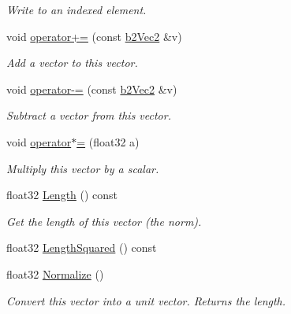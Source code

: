 \begin{DoxyCompactItemize}
\begin{DoxyCompactList}\small\item\em Write to an indexed element. \end{DoxyCompactList}\item 
\mbox{\label{structb2Vec2_a590789342e22ac1e7f9c1a63a2778b6d}} 
void \hyperlink{structb2Vec2_a590789342e22ac1e7f9c1a63a2778b6d}{operator+=} (const \hyperlink{structb2Vec2}{b2\+Vec2} \&v)
\begin{DoxyCompactList}\small\item\em Add a vector to this vector. \end{DoxyCompactList}\item 
\mbox{\label{structb2Vec2_a6b48cab4695a979ae40b7613aedc8b17}} 
void \hyperlink{structb2Vec2_a6b48cab4695a979ae40b7613aedc8b17}{operator-\/=} (const \hyperlink{structb2Vec2}{b2\+Vec2} \&v)
\begin{DoxyCompactList}\small\item\em Subtract a vector from this vector. \end{DoxyCompactList}\item 
\mbox{\label{structb2Vec2_a7097696dce578322928f4535b34f1c6b}} 
void \hyperlink{structb2Vec2_a7097696dce578322928f4535b34f1c6b}{operator$\ast$=} (float32 a)
\begin{DoxyCompactList}\small\item\em Multiply this vector by a scalar. \end{DoxyCompactList}\item 
\mbox{\label{structb2Vec2_a04cb9ac9e845a59f4212b2d7149fa3d9}} 
float32 \hyperlink{structb2Vec2_a04cb9ac9e845a59f4212b2d7149fa3d9}{Length} () const
\begin{DoxyCompactList}\small\item\em Get the length of this vector (the norm). \end{DoxyCompactList}\item 
float32 \hyperlink{structb2Vec2_af8a081dac7eea7800fdbfbf95ac9e395}{Length\+Squared} () const
\item 
\mbox{\label{structb2Vec2_adda78c92f318fe53d8a53f9b5cfd8e41}} 
float32 \hyperlink{structb2Vec2_adda78c92f318fe53d8a53f9b5cfd8e41}{Normalize} ()
\begin{DoxyCompactList}\small\item\em Convert this vector into a unit vector. Returns the length. \end{DoxyCompactList}\item 

\end{DoxyCompactItemize}
